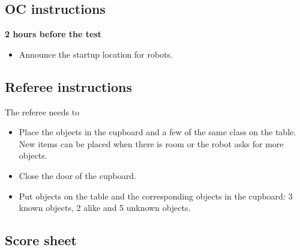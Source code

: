 \subsection{OC instructions}

\textbf{2 hours before the test}
\begin{itemize}
    \item Announce the startup location for robots.
\end{itemize}

\subsection{Referee instructions}
The referee needs to
\begin{itemize}
	\item Place the objects in the cupboard and a few of the same class on the table. New items can be placed when there is room or the robot asks for more objects.
	\item Close the door of the cupboard.
	\item Put objects on the table and the corresponding objects in the cupboard: 3 known objects, 2 alike and 5 unknown objects.
\end{itemize}


\newpage
\subsection{Score sheet}


